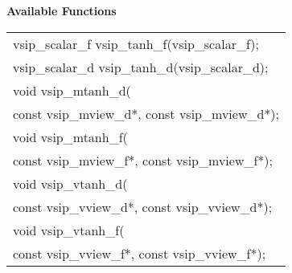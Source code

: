 \cvsiplh
\newline \hspace*{.8cm} \vspace*{.1cm} \textbf{Available Functions }
\newline \hspace*{1.1cm} {
\ttfamily
\begin{tabular}[H]{l}
vsip\_scalar\_f vsip\_tanh\_f(vsip\_scalar\_f);\\
vsip\_scalar\_d vsip\_tanh\_d(vsip\_scalar\_d);\\
void vsip\_mtanh\_d(\\*\hspace{1cm}const vsip\_mview\_d*, const vsip\_mview\_d*);\\
void vsip\_mtanh\_f(\\*\hspace{1cm}const vsip\_mview\_f*, const vsip\_mview\_f*);\\
void vsip\_vtanh\_d(\\*\hspace{1cm}const vsip\_vview\_d*, const vsip\_vview\_d*);\\
void vsip\_vtanh\_f(\\*\hspace{1cm}const vsip\_vview\_f*, const vsip\_vview\_f*);\\
\end{tabular}
}
\pyjvsiph
